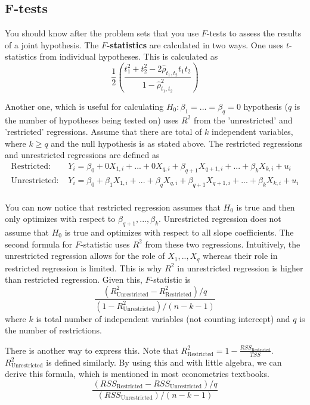 \documentclass[12pt]{article}
\theoremstyle{definition}
\theoremstyle{property}
\theoremstyle{assumption}
\theoremstyle{example}
\theoremstyle{comment}
\begin{document}
\subsection{F-tests}
You should know after the problem sets that you use $F$-tests to assess the results of a joint hypothesis. The \textbf{$F$-statistics} are calculated in two ways. One uses $t$-statistics from individual hypotheses. This is calculated as
\[
\frac{1}{2}\left(\frac{t_1^2+t_2^2-2\hat{\rho}_{t_1,t_2}t_1t_2}{1-\hat{\rho}^2_{t_1,t_2}}\right)
\]\par\medskip
Another one, which is useful for calculating $H_0: \beta_1 = ... =\beta_q=0$ hypothesis ($q$ is the number of hypotheses being tested on) uses $R^2$ from the 'unrestricted' and 'restricted' regressions. Assume that there are total of $k$ independent variables, where $k\geq q$ and the null hypothesis is as stated above. The restricted regressions and unrestricted regressions are defined as
\[\begin{aligned}
\text{Restricted: } & Y_i =\beta_0+ 0X_{1,i} + ...+ 0X_{q,i}+ \beta_{q+1}X_{q+1,i}+...+\beta_kX_{k,i} + u_i\\
\text{Unrestricted: } & Y_i = \beta_0+\beta_1X_{1,i} + ... +\beta_qX_{q,i}+ \beta_{q+1}X_{q+1,i}+...+\beta_kX_{k,i} + u_i\\
\end{aligned}\] \par\medskip
You can now notice that restricted regression assumes that $H_0$ is true and then only optimizes with respect to $\beta_{q+1},...,\beta_{k}$. Unrestricted regression does not assume that $H_0$ is true and optimizes with respect to all slope coefficients. The second formula for $F$-statistic uses $R^2$ from these two regressions. Intuitively, the unrestricted regression allows for the role of $X_1,..,X_q$ whereas their role in restricted regression is limited. This is why $R^2$ in unrestricted regression is higher than restricted regression. Given this, $F$-statistic is
\[
\frac{(R^2_{\text{Unrestricted}}-R^2_{\text{Restricted}})/q}{(1-R^2_{\text{Unrestricted}})/(n-k-1)}
\]
where $k$ is total number of independent variables (not counting intercept) and $q$ is the number of restrictions. \par\medskip
There is another way to express this. Note that $R^2_{\text{Restricted}} = 1-\frac{RSS_{\text{Restricted}}}{TSS}$. $R^2_{\text{Unrestricted}}$ is defined similarly. By using this and with little algebra, we can derive this formula, which is mentioned in most econometrics textbooks.
\[
\frac{(RSS_{\text{Restricted}}-RSS_{\text{Unrestricted}})/q}{(RSS_{\text{Unrestricted}})/(n-k-1)}
\] \par\medskip

\end{document}
